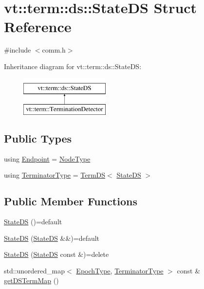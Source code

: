 \hypertarget{structvt_1_1term_1_1ds_1_1_state_d_s}{}\section{vt\+:\+:term\+:\+:ds\+:\+:State\+DS Struct Reference}
\label{structvt_1_1term_1_1ds_1_1_state_d_s}


{\ttfamily \#include $<$comm.\+h$>$}

Inheritance diagram for vt\+:\+:term\+:\+:ds\+:\+:State\+DS\+:\begin{figure}[H]
\begin{center}
\leavevmode
\includegraphics[height=2.000000cm]{structvt_1_1term_1_1ds_1_1_state_d_s}
\end{center}
\end{figure}
\subsection*{Public Types}
\begin{DoxyCompactItemize}
\item 
using \hyperlink{structvt_1_1term_1_1ds_1_1_state_d_s_aba302de614dd639f5d93f4f5b6dd6108}{Endpoint} = \hyperlink{namespacevt_a866da9d0efc19c0a1ce79e9e492f47e2}{Node\+Type}
\item 
using \hyperlink{structvt_1_1term_1_1ds_1_1_state_d_s_af98cfe31c25f710273ee103026d538e4}{Terminator\+Type} = \hyperlink{structvt_1_1term_1_1ds_1_1_term_d_s}{Term\+DS}$<$ \hyperlink{structvt_1_1term_1_1ds_1_1_state_d_s}{State\+DS} $>$
\end{DoxyCompactItemize}
\subsection*{Public Member Functions}
\begin{DoxyCompactItemize}
\item 
\hyperlink{structvt_1_1term_1_1ds_1_1_state_d_s_a8b90d70734aebbe6cbea49fa8fc713f2}{State\+DS} ()=default
\item 
\hyperlink{structvt_1_1term_1_1ds_1_1_state_d_s_aa84d97ee4f2f52142bddb1ec2238a722}{State\+DS} (\hyperlink{structvt_1_1term_1_1ds_1_1_state_d_s}{State\+DS} \&\&)=default
\item 
\hyperlink{structvt_1_1term_1_1ds_1_1_state_d_s_a83663b5cf3c5cc43eaa8bb0bd5edee31}{State\+DS} (\hyperlink{structvt_1_1term_1_1ds_1_1_state_d_s}{State\+DS} const \&)=delete
\item 
std\+::unordered\+\_\+map$<$ \hyperlink{namespacevt_a81d11b28122d43bf9834577e4a06440f}{Epoch\+Type}, \hyperlink{structvt_1_1term_1_1ds_1_1_state_d_s_af98cfe31c25f710273ee103026d538e4}{Terminator\+Type} $>$ const  \& \hyperlink{structvt_1_1term_1_1ds_1_1_state_d_s_ac016de8bc9946fdf5386ff17b0ee3ab6}{get\+D\+S\+Term\+Map} ()
\end{DoxyCompactItemize}
